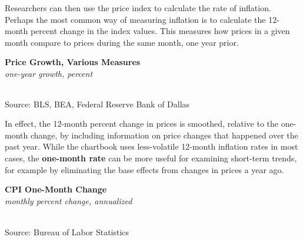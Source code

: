\documentclass{report}
\newcommand{\tbllink}[1]{\href{https://raw.githubusercontent.com/bdecon/US-chartbook/master/chartbook/data/#1}{\faTable}}
\newcommand{\bbar}[2]{extra #1 ticks = {{#2}}, extra #1 tick labels = ,
		extra #1 tick style = {grid=major, grid style={thick, black!25}},}
\begin{document}
{\begin{minipage}{0.76\textwidth}
Researchers can then use the price index to calculate the rate of inflation. Perhaps the most common way of measuring inflation is to calculate the 12-month percent change in the index values. This measures how prices in a given month compare to prices during the same month, one year prior. 
\vspace{1mm}

\normalsize \textbf{Price Growth, Various Measures}\\
\footnotesize{\textit{one-year growth, percent}}\\
\hspace*{-2mm}  \setlength{\tabcolsep}{3.1pt} \color{black!90}
	{\renewcommand{\arraystretch}{1.6}
		\begin{tabular}{p{30mm} R{7.6mm} R{7.6mm} R{7.6mm} R{7.6mm} R{7.6mm} R{7.6mm} 
		   R{9.2mm} R{8.5mm}}
			  \hline
		\end{tabular}}\vspace{-1mm}
		
\footnotesize{Source: BLS, BEA, Federal Reserve Bank of Dallas}
\vspace{2mm}

\small In effect, the 12-month percent change in prices is smoothed, relative to the one-month change, by including information on price changes that happened over the past year. While the chartbook uses less-volatile 12-month inflation rates in most cases, the \textbf{one-month rate} can be more useful for examining short-term trends, for example by eliminating the base effects from changes in prices a year ago. 


\vspace{1mm}

\normalsize \textbf{CPI One-Month Change}\\
\footnotesize{\textit{monthly percent change, annualized}}
\vspace*{-4mm}

\hspace*{-3mm} \\
\footnotesize{Source: Bureau of Labor Statistics} \hfill \tbllink{cpi_monthly.csv}
\end{minipage}
\newpage
\hypertarget{prin}{}
\begin{minipage}{0.76\textwidth}

\end{minipage}}
\end{document}
